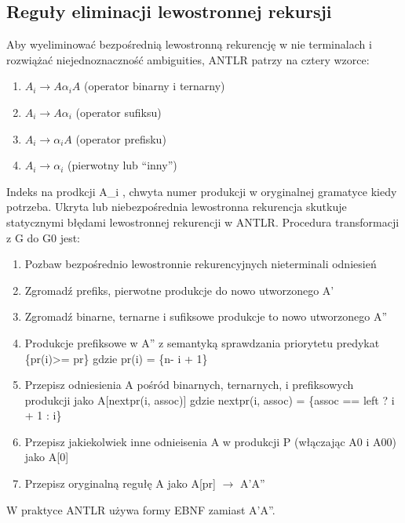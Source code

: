 \subsection{Reguły eliminacji lewostronnej rekursji}
Aby wyeliminować bezpośrednią lewostronną rekurencję w nie terminalach
i rozwiążać niejednoznaczność ambiguities, ANTLR patrzy na cztery wzorce:
\begin{enumerate}
\item $A_i \rightarrow A\alpha_i A$ (operator binarny i ternarny)
\item $A_i \rightarrow A\alpha_i$ (operator sufiksu)
\item $A_i \rightarrow \alpha_iA$ (operator prefisku)
\item $A_i \rightarrow \alpha_i$ (pierwotny lub “inny”)
\end{enumerate}
Indeks na prodkcji A_i , chwyta numer produkcji 
w oryginalnej gramatyce kiedy potrzeba. Ukryta lub niebezpośrednia 
lewostronna rekurencja skutkuje statycznymi błędami lewostronnej rekurencji w ANTLR.
Procedura transformacji z G do G0 jest:
\begin{enumerate}
\item Pozbaw bezpośrednio lewostronnie rekurencyjnych  nieterminali odniesień
\item Zgromadź prefiks, pierwotne produkcje do nowo utworzonego A'
\item Zgromadź binarne, ternarne i sufiksowe produkcje to nowo utworzonego A''
\item Produkcje prefiksowe w A'' z semantyką sprawdzania priorytetu predykat
\{pr(i)>= pr\} gdzie pr(i) = \{n- i + 1\}
\item Przepisz odniesienia A pośród binarnych, ternarnych, i prefiksowych produkcji
jako A[nextpr(i, assoc)] gdzie
nextpr(i, assoc) = \{assoc == left ? i + 1 : i\}
\item Przepisz jakiekolwiek inne odnieisenia A w produkcji P
(włączając A0 i A00) jako A[0]
\item Przepisz oryginalną regułę A jako A[pr] $\rightarrow$ A'A''
\end{enumerate}
W praktyce ANTLR używa formy EBNF zamiast A'A''.


